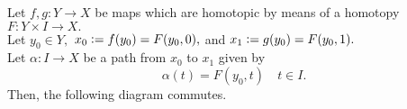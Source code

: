 \documentclass[12pt]{article}
\begin{document}
\begin{prop} \label{prop:homsamehomo}
	Let $f, g:Y\to X$ be maps which are homotopic by means of a homotopy $F:Y \times I \to X.$ \\
	Let $y_0 \in Y,$ $x_0 \vcentcolon= f(y_0) = F(y_0, 0),$ and $x_1 \vcentcolon= g(y_0) = F(y_0, 1).$\\
	Let $\alpha:I \to X$ be a path from $x_0$ to $x_1$ given by
	\begin{equation*} 
		\alpha(t) = F(y_0, t) \quad t \in I.
	\end{equation*}
	Then, the following diagram commutes.
	\begin{center}
	\end{center}
\end{prop}
\end{document}
